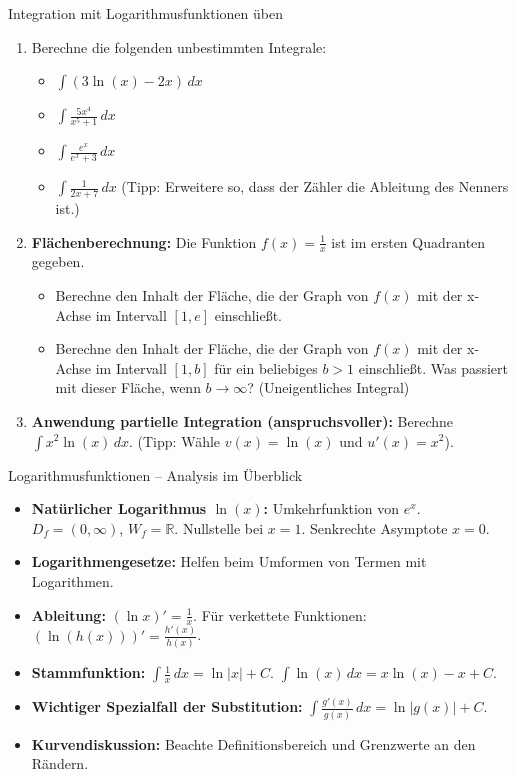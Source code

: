 \begin{aufgabenumgebung}{Integration mit Logarithmusfunktionen üben}
\begin{enumerate}
    \item Berechne die folgenden unbestimmten Integrale:
        \begin{itemize}
            \item $\int (3\ln(x) - 2x) \,dx$
            \item $\int \frac{5x^4}{x^5+1} \,dx$
            \item $\int \frac{e^x}{e^x+3} \,dx$
            \item $\int \frac{1}{2x+7} \,dx$ (Tipp: Erweitere so, dass der Zähler die Ableitung des Nenners ist.)
        \end{itemize}
    \item \textbf{Flächenberechnung:}
        Die Funktion $f(x) = \frac{1}{x}$ ist im ersten Quadranten gegeben.
        \begin{itemize}
            \item Berechne den Inhalt der Fläche, die der Graph von $f(x)$ mit der x-Achse im Intervall $[1, e]$ einschließt.
            \item Berechne den Inhalt der Fläche, die der Graph von $f(x)$ mit der x-Achse im Intervall $[1, b]$ für ein beliebiges $b>1$ einschließt. Was passiert mit dieser Fläche, wenn $b \to \infty$? (Uneigentliches Integral)
        \end{itemize}
    \item \textbf{Anwendung partielle Integration (anspruchsvoller):}
        Berechne $\int x^2 \ln(x) \,dx$. (Tipp: Wähle $v(x)=\ln(x)$ und $u'(x)=x^2$).
\end{enumerate}
\end{aufgabenumgebung}

\begin{kurzknappumgebung}{Logarithmusfunktionen – Analysis im Überblick}
\begin{itemize}
    \item \textbf{Natürlicher Logarithmus $\ln(x)$:} Umkehrfunktion von $e^x$. $D_f=(0,\infty)$, $W_f=\mathbb{R}$. Nullstelle bei $x=1$. Senkrechte Asymptote $x=0$.
    \item \textbf{Logarithmengesetze:} Helfen beim Umformen von Termen mit Logarithmen.
    \item \textbf{Ableitung:} $(\ln x)' = \frac{1}{x}$. Für verkettete Funktionen: $(\ln(h(x)))' = \frac{h'(x)}{h(x)}$.
    \item \textbf{Stammfunktion:} $\int \frac{1}{x} \,dx = \ln|x|+C$. $\int \ln(x) \,dx = x\ln(x) - x + C$.
    \item \textbf{Wichtiger Spezialfall der Substitution:} $\int \frac{g'(x)}{g(x)} \,dx = \ln|g(x)|+C$.
    \item \textbf{Kurvendiskussion:} Beachte Definitionsbereich und Grenzwerte an den Rändern.
\end{itemize}
\end{kurzknappumgebung}

